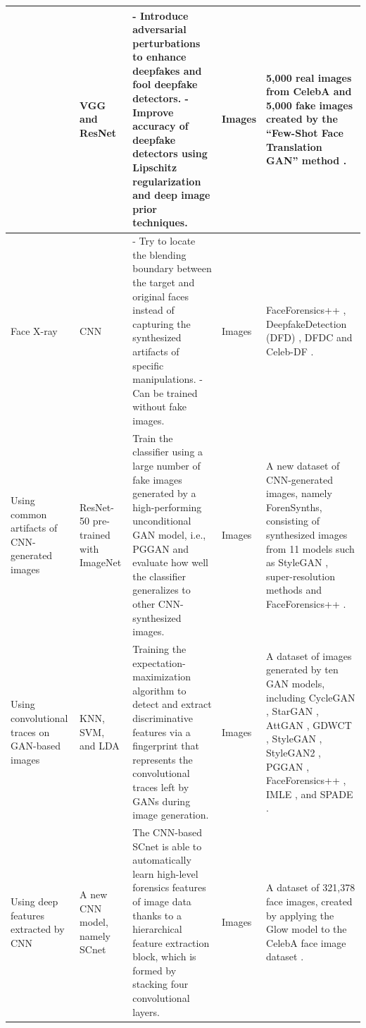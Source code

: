 \begin{table}[h!]
\begin{scriptsize}
\begin{tabularx}{\linewidth}{p{} p{} p{} p{} p{}}
& VGG  and ResNet 
& - Introduce adversarial perturbations to enhance deepfakes and fool deepfake detectors.\newline
- Improve accuracy of deepfake detectors using Lipschitz regularization and deep image prior techniques.
& Images
& 5,000 real images from CelebA  and 5,000 fake images created by the “Few-Shot Face Translation GAN” method .\\
\hline
Face X-ray 
& CNN
& - Try to locate the blending boundary between the target and original faces instead of capturing the synthesized artifacts of specific manipulations.\newline
- Can be trained without fake images.
& Images
& FaceForensics++ , DeepfakeDetection (DFD) , DFDC  and Celeb-DF .\\
\hline
Using common artifacts of CNN-generated images 
& ResNet-50 
pre-trained with ImageNet 
& Train the classifier using a large number of fake images generated by a high-performing unconditional GAN model, i.e., PGGAN  and evaluate how well the classifier generalizes to other CNN-synthesized images.
& Images
& A new dataset of CNN-generated images, namely ForenSynths, consisting of
synthesized images from 11 models such as StyleGAN , super-resolution methods  and FaceForensics++ .\\
\hline
Using convolutional traces on GAN-based images 
& KNN, SVM, and LDA
& Training the expectation-maximization algorithm  to detect
and extract discriminative features via a fingerprint that represents the convolutional traces left by GANs during image generation.
& Images
& A dataset of images generated by ten GAN models, including CycleGAN , StarGAN , AttGAN , GDWCT , StyleGAN , StyleGAN2 , PGGAN , FaceForensics++ , IMLE , and
SPADE .\\
\hline
Using deep features extracted by CNN 
& A new CNN model, namely SCnet
& The CNN-based SCnet is able to automatically learn high-level forensics features of image data thanks to a hierarchical feature extraction block, which is formed by stacking four convolutional layers.
& Images
& A dataset of 321,378 face images, created by applying the Glow model  to the CelebA face image dataset .
\\
\bottomrule
\end{tabularx}
\end{scriptsize}
\end{table}

